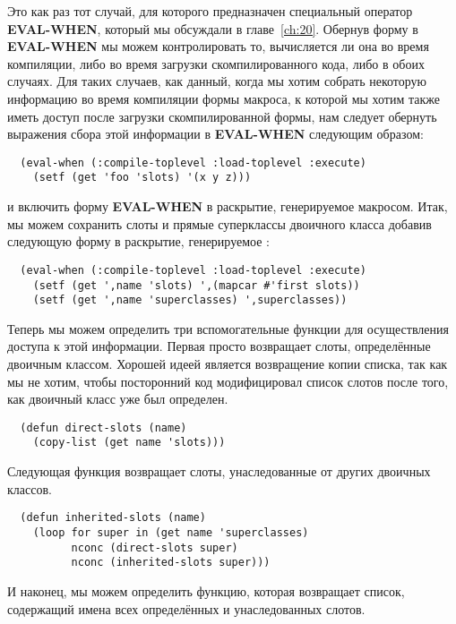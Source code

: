 Это как раз тот случай, для которого предназначен специальный оператор \textbf{EVAL-WHEN},
который мы обсуждали в главе~\ref{ch:20}. Обернув форму в \textbf{EVAL-WHEN} мы можем
контролировать то, вычисляется ли она во время компиляции, либо во время загрузки
скомпилированного кода, либо в обоих случаях. Для таких случаев, как данный, когда мы
хотим собрать некоторую информацию во время компиляции формы макроса, к которой мы хотим
также иметь доступ после загрузки скомпилированной формы, нам следует обернуть выражения
сбора этой информации в \textbf{EVAL-WHEN} следующим образом:

\begin{lstlisting}
  (eval-when (:compile-toplevel :load-toplevel :execute)
    (setf (get 'foo 'slots) '(x y z)))
\end{lstlisting}

и включить форму \textbf{EVAL-WHEN} в раскрытие, генерируемое макросом. Итак, мы можем
сохранить слоты и прямые суперклассы двоичного класса добавив следующую форму в раскрытие,
генерируемое :

\begin{lstlisting}
  (eval-when (:compile-toplevel :load-toplevel :execute)
    (setf (get ',name 'slots) ',(mapcar #'first slots))
    (setf (get ',name 'superclasses) ',superclasses))
\end{lstlisting}

Теперь мы можем определить три вспомогательные функции для осуществления доступа к этой
информации. Первая просто возвращает слоты, определённые двоичным классом. Хорошей идеей
является возвращение копии списка, так как мы не хотим, чтобы посторонний код
модифицировал список слотов после того, как двоичный класс уже был определен.

\begin{lstlisting}
  (defun direct-slots (name)
    (copy-list (get name 'slots)))
\end{lstlisting}

Следующая функция возвращает слоты, унаследованные от других двоичных классов.

\begin{lstlisting}
  (defun inherited-slots (name)
    (loop for super in (get name 'superclasses)
          nconc (direct-slots super)
          nconc (inherited-slots super)))
\end{lstlisting}

И наконец, мы можем определить функцию, которая возвращает список, содержащий имена всех
определённых и унаследованных слотов.

